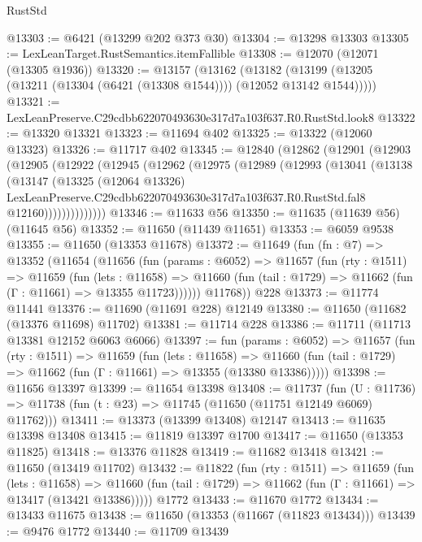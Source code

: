\begin{lexlean}{RustStd}
\begin{coremodule}
@13303 := @6421 (@13299 @202 @373 @30)
@13304 := @13298 @13303
@13305 := LexLeanTarget.RustSemantics.itemFallible
@13308 := @12070 (@12071 (@13305 @1936))
@13320 := @13157
    (@13162
      (@13182 (@13199 (@13205 (@13211 (@13304 (@6421 (@13308 @1544)))) (@12052 @13142 @1544)))))
@13321 := LexLeanPreserve.C29cdbb622070493630e317d7a103f637.R0.RustStd.look8
@13322 := @13320 @13321
@13323 := @11694 @402
@13325 := @13322 (@12060 @13323)
@13326 := @11717 @402
@13345 := @12840
    (@12862
      (@12901
        (@12903
          (@12905
            (@12922
              (@12945
                (@12962
                  (@12975
                    (@12989
                      (@12993
                        (@13041
                          (@13138
                            (@13147
                              (@13325
                                (@12064 @13326)
                                LexLeanPreserve.C29cdbb622070493630e317d7a103f637.R0.RustStd.fal8
                                @12160))))))))))))))
@13346 := @11633 @56
@13350 := @11635 (@11639 @56) (@11645 @56)
@13352 := @11650 (@11439 @11651)
@13353 := @6059 @9538
@13355 := @11650 (@13353 @11678)
@13372 := @11649
    (fun (fn : @7) =>
    @13352
      (@11654
        (@11656
          (fun (params : @6052) =>
          @11657
            (fun (rty : @1511) =>
            @11659
              (fun (lets : @11658) =>
              @11660 (fun (tail : @1729) => @11662 (fun (Γ : @11661) => @13355 @11723))))))
        @11768))
    @228
@13373 := @11774 @11441
@13376 := @11690 (@11691 @228) @12149
@13380 := @11650 (@11682 (@13376 @11698) @11702)
@13381 := @11714 @228
@13386 := @11711 (@11713 @13381 @12152 @6063 @6066)
@13397 := fun (params : @6052) =>
  @11657
    (fun (rty : @1511) =>
    @11659
      (fun (lets : @11658) =>
      @11660 (fun (tail : @1729) => @11662 (fun (Γ : @11661) => @13355 (@13380 @13386)))))
@13398 := @11656 @13397
@13399 := @11654 @13398
@13408 := @11737
    (fun (U : @11736) => @11738 (fun (t : @23) => @11745 (@11650 (@11751 @12149 @6069) @11762)))
@13411 := @13373 (@13399 @13408) @12147
@13413 := @11635 @13398 @13408
@13415 := @11819 @13397 @1700
@13417 := @11650 (@13353 @11825)
@13418 := @13376 @11828
@13419 := @11682 @13418
@13421 := @11650 (@13419 @11702)
@13432 := @11822
    (fun (rty : @1511) =>
    @11659
      (fun (lets : @11658) =>
      @11660 (fun (tail : @1729) => @11662 (fun (Γ : @11661) => @13417 (@13421 @13386)))))
    @1772
@13433 := @11670 @1772
@13434 := @13433 @11675
@13438 := @11650 (@13353 (@11667 (@11823 @13434)))
@13439 := @9476 @1772
@13440 := @11709 @13439

\end{coremodule}
\end{lexlean}
